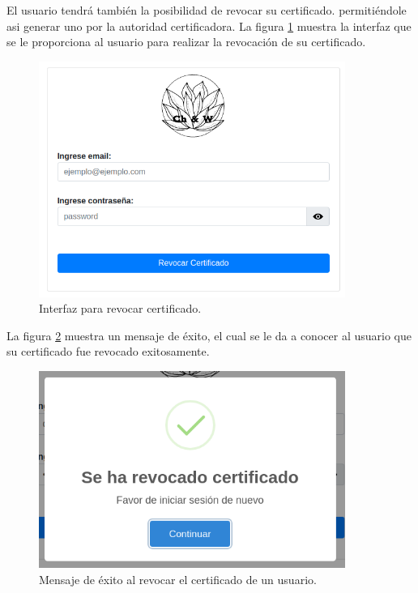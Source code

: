 \documentclass[12pt, a4paper, titlepage]{report}
\begin{document}
    			
			El usuario tendrá también la posibilidad de revocar su certificado. permitiéndole asi generar uno por la autoridad certificadora. La figura \ref{fig:UI_revocarCertificado} muestra la interfaz que se le proporciona al usuario para realizar la revocación de su certificado.
			
		    \begin{figure}[H]
				\begin{center}	\includegraphics[width=10cm]{./imagenes/Disenio/Componente_1/UI_revocarCertificado.PNG}
					\caption[Interfaz]{Interfaz para revocar certificado.}
				\label{fig:UI_revocarCertificado}
				\end{center}
			\end{figure}
			
			
			La figura \ref{fig:UI_revocacionExito} muestra un mensaje de éxito, el cual se le da a conocer al usuario que su certificado fue revocado exitosamente.
    			
    			\begin{figure}[H]
    				\begin{center}	\includegraphics[width=10cm]{./imagenes/Disenio/Componente_1/UI_revocacionExito.PNG}
    					\caption[Mensaje de éxito]{Mensaje de éxito al revocar el certificado de un usuario.}
    				\label{fig:UI_revocacionExito}
    				\end{center}
    			\end{figure}
			
\end{document}
